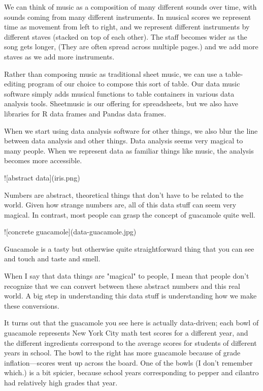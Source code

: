\documentclass{acm_proc_article-sp}
\begin{document}
We can think of music as a composition of many different sounds over time,
with sounds coming from many different instruments. In musical scores
we represent time as movement from left to right, and we represent different
instruments by different staves (stacked on top of each other).
The staff becomes wider as the song gets longer, (They are often spread
across multiple pages.) and we add more staves as we add more instruments.

Rather than composing music as traditional sheet music,
we can use a table-editing program of our choice to compose
this sort of table. Our data music software simply adds
musical functions to table containers in various data analysis
tools. Sheetmusic is our offering for spreadsheets, but we
also have libraries for R data frames\cite{ddr} and Pandas
data frames.\cite{ddpy}










When we start using data analysis software for other things,
we also blur the line between data analysis and other things.
Data analysis seems very magical to many people. When we represent
data as familiar things like music, the analysis becomes more
accessible.

![abstract data](iris.png)

Numbers are abstract, theoretical things that don't have to be
related to the world. Given how strange numbers are, all of this
data stuff can seem very magical. In contrast, most people can
grasp the concept of guacamole quite well.

![concrete guacamole](data-guacamole.jpg)

Guacamole is a tasty but otherwise quite straightforward thing
that you can see and touch and taste and smell.

When I say that data things are "magical" to people, I mean that
people don't recognize that we can convert between these abstract
numbers and this real world. A big step in understanding this data
stuff is understanding how we make these conversions.

It turns out that the guacamole you see here is actually data-driven;
each bowl of guacamole represents New York City math test scores for
a different year, and the different ingredients correspond to the
average scores for students of different years in school. The bowl
to the right has more guacamole because of grade inflation---scores
went up across the board. One of the bowls (I don't remember which.)
is a bit spicier, because school years corresponding to pepper and
cilantro had relatively high grades that year.
\end{document}
